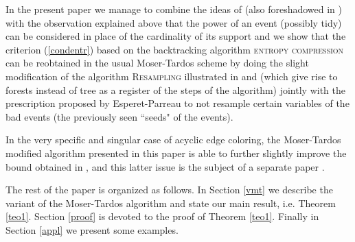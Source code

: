 \documentclass[11pt]{article}
\let\a=\alpha \let\b=\beta \let\ch=\chi \let\d=\delta \let\e=\varepsilon
\let\\=\noindent
\def\ee{\end{equation}}
\def\be{\begin{equation}}
\let\a=\alpha \let\b=\beta \let\ch=\chi \let\d=\delta \let\e=\varepsilon
\let\\=\noindent
\def\ee{\end{equation}}
\def\be{\begin{equation}}
\def\prob{{\rm Prob}}
\def\ev{{\mathfrak{e}}}
\begin{document}
%






\\In the present  paper we
manage to combine the  ideas of \cite{GKPT} (also foreshadowed  in \cite{KL})
with the observation explained above that the power of an event (possibly tidy) can be considered in place of the cardinality of its support
and we  show that
the  criterion  (\ref{condentr}) based on the backtracking algorithm \textsc{entropy compression} can be reobtained in the usual
 Moser-Tardos scheme by doing the slight modification of the  algorithm \textsc{Resampling}  illustrated  in \cite{KL} and \cite{GKPT}  (which give rise to forests instead of tree as a register of the steps of the algorithm) jointly with the prescription proposed by Esperet-Parreau to not resample certain variables of the bad events (the previously seen  ``seeds" of the events).

 \\In the very specific and  singular case of acyclic edge coloring,
 the Moser-Tardos modified algorithm presented in this paper is able to further slightly improve the  bound obtained in \cite{GKPT}, and this latter issue is the subject of a separate paper \cite{FLP}.



\\The rest of the paper is organized as follows. In Section \ref{vmt} we describe the variant of the Moser-Tardos algorithm and state our
main result, i.e. Theorem \ref{teo1}. Section \ref{proof} is devoted to the proof of Theorem \ref{teo1}.
Finally in Section \ref{appl} we present some examples.
\end{document}
